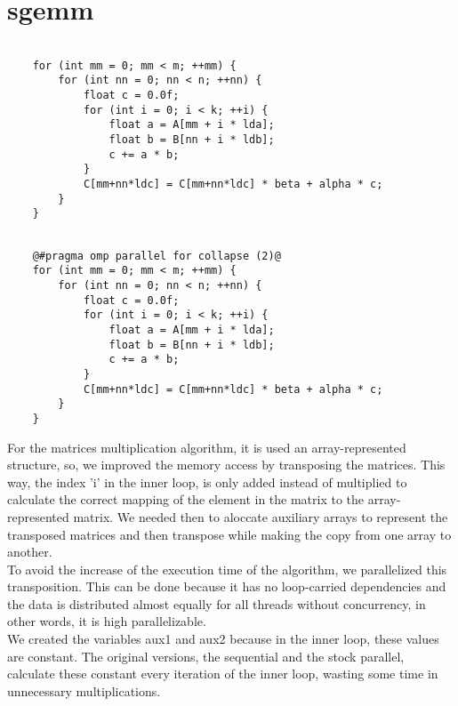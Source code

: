 \documentclass[10pt,a4paper]{report}
\begin{document}
\section{sgemm}
\begin{center}
\begin{minipage}{.48\textwidth}
\begin{lstlisting}[caption=Parboil sequential source code for sgemm,style=base]

	for (int mm = 0; mm < m; ++mm) {
		for (int nn = 0; nn < n; ++nn) {
			float c = 0.0f;
			for (int i = 0; i < k; ++i) {
				float a = A[mm + i * lda]; 
				float b = B[nn + i * ldb];		
				c += a * b;
			}
			C[mm+nn*ldc] = C[mm+nn*ldc] * beta + alpha * c;
		}
	}
\end{lstlisting}
\end{minipage}
\hfill
\begin{minipage}{.48\textwidth}
\begin{lstlisting}[caption=Parboil parallel source code for sgemm,style=base]

	@#pragma omp parallel for collapse (2)@
	for (int mm = 0; mm < m; ++mm) {
		for (int nn = 0; nn < n; ++nn) {
			float c = 0.0f;
			for (int i = 0; i < k; ++i) {
				float a = A[mm + i * lda]; 
				float b = B[nn + i * ldb];
				c += a * b;
			}
			C[mm+nn*ldc] = C[mm+nn*ldc] * beta + alpha * c;
		}
	}
\end{lstlisting}
\end{minipage}
\end{center}

For the matrices multiplication algorithm, it is used an array-represented structure, so, we improved the memory access by transposing the matrices. This way, the index 'i' in the inner loop, is only added instead of multiplied to calculate the correct mapping of the element in the matrix to the array-represented matrix. We needed then to aloccate auxiliary arrays to represent the transposed matrices and then transpose while making the copy from one array to another. \\

To avoid the increase of the execution time of the algorithm, we parallelized this transposition. This can be done because it has no loop-carried dependencies and the data is distributed almost equally for all threads without concurrency, in other words, it is high parallelizable. \\

We created the variables aux1 and aux2 because in the inner loop, these values are constant. The original versions, the sequential and the stock parallel, calculate these constant every iteration of the inner loop, wasting some time in unnecessary multiplications. \\
\end{document}
